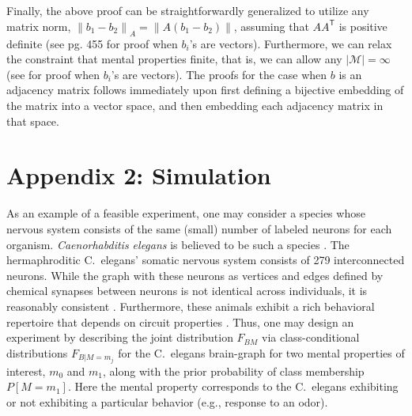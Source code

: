 \documentclass[10pt]{article}
\newcommand{\mM}{\mathcal{M}}
\providecommand{\norm}[1]{\left \lVert#1 \right  \rVert}
\newcommand{\T}{^{\ensuremath{\mathsf{T}}}}           %
\begin{document}
Finally, the above proof can be straightforwardly generalized to utilize any matrix norm, $\norm{b_1-b_2}_A=\norm{A(b_1-b_2)}$, assuming that $A A\T$ is positive definite (see \cite{DGL96} pg. 455 for proof when $b_i$'s are vectors).  Furthermore, we can relax the constraint that mental properties finite, that is, we can allow any $|\mM| = \infty$ (see \cite{Stone77} for proof when $b_i$'s are vectors).  The proofs for the case when $b$ is an adjacency matrix follows immediately upon first defining a bijective embedding of the matrix into a vector space, and then embedding each adjacency matrix in that space.  

\section*{Appendix 2: Simulation} \label{simulation}

As an example of a feasible experiment, one may consider a species whose nervous system consists of the same (small) number of labeled neurons for each organism. {\it Caenorhabditis elegans} is believed to be such a species \cite{Durbin87}. The hermaphroditic C.~elegans' somatic nervous system consists of 279 interconnected neurons. While the graph with these neurons as vertices and edges defined by chemical synapses between neurons is not identical across individuals, it is reasonably consistent \cite{Durbin87}. Furthermore, these animals exhibit a rich behavioral repertoire that depends on circuit properties \cite{deBonoMaricq05}. Thus, one may design an experiment by describing the joint distribution $F_{BM}$ via class-conditional distributions $F_{B|M=m_j}$ for the C.~elegans brain-graph for two mental properties of interest, $m_0$ and $m_1$, along with the prior probability of class membership $P[M=m_1]$. Here the mental property corresponds to the C.~elegans exhibiting or not exhibiting a particular behavior (e.g., response to an odor).
\end{document}

